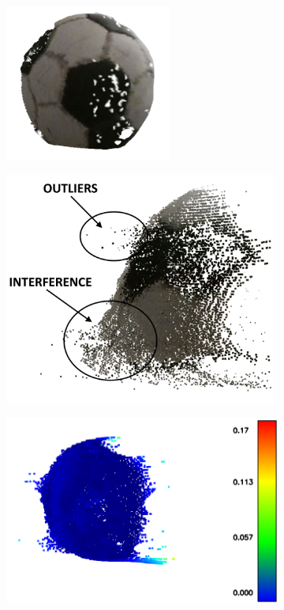 \begin{figure}[h]
	\centering
	\begin{subfigure}[b]{0.3\textwidth}
		\centering
		\includegraphics[width=0.6\textwidth]{figures/ball_mesh.png}
		\caption{}
		\label{fig:ball:a}
	\end{subfigure}
	\hfill
	\begin{subfigure}[b]{0.3\textwidth}
		\centering
		\includegraphics[width=\textwidth]{figures/ball_interf.png}
		\caption{}
		\label{fig:ball:b}
	\end{subfigure}
	\hfill
	\begin{subfigure}[b]{0.3\textwidth}
		\centering
		\includegraphics[width=\textwidth]{figures/ball_imbm.png}

\end{subfigure}
\end{figure}
